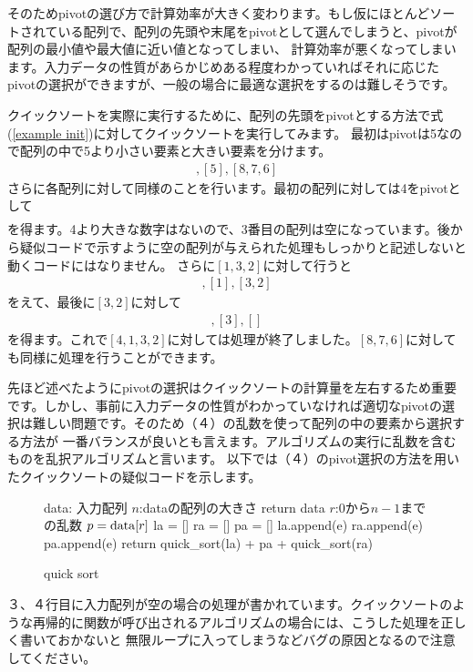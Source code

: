 \documentclass[dvipdfmx,pic,eepic,ecltree]{jarticle}
\begin{document}
そのためpivotの選び方で計算効率が大きく変わります。もし仮にほとんどソートされている配列で、配列の先頭や末尾をpivotとして選んでしまうと、pivotが配列の最小値や最大値に近い値となってしまい、
計算効率が悪くなってしまいます。入力データの性質があらかじめある程度わかっていればそれに応じたpivotの選択ができますが、一般の場合に最適な選択をするのは難しそうです。

クイックソートを実際に実行するために、配列の先頭をpivotとする方法で式(\ref{example init})に対してクイックソートを実行してみます。
最初はpivotは5なので配列の中で5より小さい要素と大きい要素を分けます。
\begin{eqnarray}
[4, 1, 3, 2] , [5] , [8, 7, 6]
\end{eqnarray}
さらに各配列に対して同様のことを行います。最初の配列に対しては4をpivotとして
\begin{eqnarray}
[1, 3, 2]  [4]  []
\end{eqnarray}
を得ます。4より大きな数字はないので、3番目の配列は空になっています。後から疑似コードで示すように空の配列が与えられた処理もしっかりと記述しないと
動くコードにはなりません。
さらに$[1,3,2]$に対して行うと
\begin{eqnarray}
[] , [1] , [3, 2]
\end{eqnarray}
をえて、最後に$[3, 2]$に対して
\begin{eqnarray}
[2] , [3] , []
\end{eqnarray}
を得ます。これで$[4, 1, 3, 2]$に対しては処理が終了しました。$ [8, 7, 6]$に対しても同様に処理を行うことができます。

先ほど述べたようにpivotの選択はクイックソートの計算量を左右するため重要です。しかし、事前に入力データの性質がわかっていなければ適切なpivotの選択は難しい問題です。そのため（４）の乱数を使って配列の中の要素から選択する方法が
一番バランスが良いとも言えます。アルゴリズムの実行に乱数を含むものを乱択アルゴリズムと言います。
以下では（４）のpivot選択の方法を用いたクイックソートの疑似コードを示します。
\begin{figure}[H]
\begin{algorithm}[H]
	\caption{quick sort}
	\label{quick sort}
	\begin{algorithmic}[1] 
	\STATE data: 入力配列
	\STATE $n$:dataの配列の大きさ
	\STATE return data
	\ENDIF
	\STATE $r$:$0$から$n-1$までの乱数
	\STATE $p = {\rm data}[r]$
	\STATE la = []
	\STATE ra = []
	\STATE pa = []
    	\STATE la.append(e)
	\ELSE
	\STATE ra.append(e)
	\ELSE
	\STATE pa.append(e)
	\ENDIF
	\ENDIF
	\ENDFOR
	\STATE return quick\_sort(la) + pa + quick\_sort(ra)
	\end{algorithmic}
\end{algorithm}
\end{figure}
３、４行目に入力配列が空の場合の処理が書かれています。クイックソートのような再帰的に関数が呼び出されるアルゴリズムの場合には、こうした処理を正しく書いておかないと
無限ループに入ってしまうなどバグの原因となるので注意してください。
\end{document}
